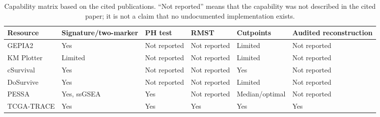 \begin{table}[t]
\centering
\begingroup
\scriptsize
\setlength{\tabcolsep}{2.5pt}
\renewcommand{\arraystretch}{1.08}
\caption{Capability matrix based on the cited publications. ``Not reported''
means that the capability was not described in the cited paper; it is not a
claim that no undocumented implementation exists.}
\label{tab:comparator-matrix}
\begin{tabularx}{\linewidth}{lXXXXX}
\toprule
Resource & Signature/two-marker & PH test & RMST & Cutpoints & Audited reconstruction \\
\midrule
GEPIA2~\citep{gepia22019} & Yes & Not reported & Not reported & Limited & Not reported \\
KM Plotter~\citep{kmplotter2021} & Limited & Not reported & Not reported & Limited & Not reported \\
cSurvival~\citep{csurvival2022} & Yes & Not reported & Not reported & Yes & Not reported \\
DoSurvive~\citep{dousurvive2023} & Yes & Not reported & Not reported & Limited & Not reported \\
PESSA~\citep{pessa2024} & Yes, ssGSEA & Yes & Not reported & Median/optimal & Not reported \\
TCGA-TRACE & Yes & Yes & Yes & Yes & Yes \\
\bottomrule
\end{tabularx}
\endgroup
\end{table}
